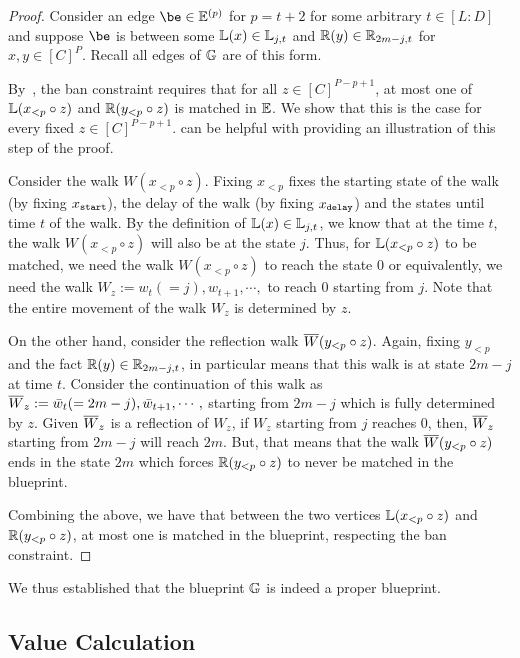 \begin{proof}

	Consider an edge $\be \in \bEE{p}$ for  $p=t+2$ for some arbitrary $t \in [L:D]$ and suppose $\be$ is between some $\mathbb{L}(x) \in \mathbb{L}_{j,t}$ and $\mathbb{R}(y) \in \mathbb{R}_{2m-j,t}$ for $x,y \in [C]^P$. Recall all edges of $\mathbb{G}$ are of this form. 
	
	By~, the ban constraint requires that for all $z \in [C]^{P-p+1}$, at most one of $\mathbb{L}(x_{<p} \circ z)$ and $\mathbb{R}(y_{<p} \circ z)$ is matched in $\mathbb{E}$. We show that this is the case for every fixed $z \in [C]^{P-p+1}$. 
	 can be helpful with providing an illustration of this step of the proof. 
	


	
	Consider the walk $W(x_{<p} \circ z)$. Fixing $x_{<p}$ fixes the starting state of the walk (by fixing $x_{\textnormal{\texttt{start}}}$), the delay of the walk (by fixing $x_{\textnormal{\texttt{delay}}}$) and the states until time $t$ of the walk. 
	By the definition of $\mathbb{L}(x) \in \mathbb{L}_{j,t}$, we know that at the time $t$, the walk $W(x_{<p} \circ z)$ will also be at the state $j$. 
	Thus, for $\mathbb{L}(x_{<p} \circ z)$ to be matched, we need the walk $W(x_{<p} \circ z)$ to reach the state $0$ or equivalently, we need the walk $W_z := w_t(=j),w_{t+1},\cdots,$ to reach $0$ starting from $j$. 
	 Note that the entire movement of the walk $W_z$ is determined by $z$.  
	
	On the other hand, consider the reflection walk $\overline{W}(y_{<p} \circ z)$. Again, fixing $y_{<p}$ and the fact $\mathbb{R}(y) \in \mathbb{R}_{2m-j,t}$, in particular means that this walk is at state $2m-j$ at time $t$. 
	Consider the continuation of this walk as $\overline{W}_z := \bar{w}_t (=2m-j), \bar{w}_{t+1},\cdots,$ starting from $2m-j$ which is fully determined by $z$. 
	Given $\overline{W}_z$ is a reflection of $W_z$, if $W_z$ starting from $j$ reaches $0$, then, $\overline{W}_z$ starting from $2m-j$ will reach $2m$. 
	But, that means that the walk $\overline{W}(y_{<p} \circ z)$ ends in the state $2m$ which forces $\mathbb{R}(y_{<p} \circ z)$ to never be matched in the blueprint. 
	
	Combining the above, we have that between the two vertices $\mathbb{L}(x_{<p} \circ z)$ and $\mathbb{R}(y_{<p} \circ z)$, at most one is matched in the blueprint, respecting the ban constraint. 
\end{proof}

	


We thus established that the blueprint $\mathbb{G}$ is indeed a proper blueprint. 

\subsection{Value Calculation} 

